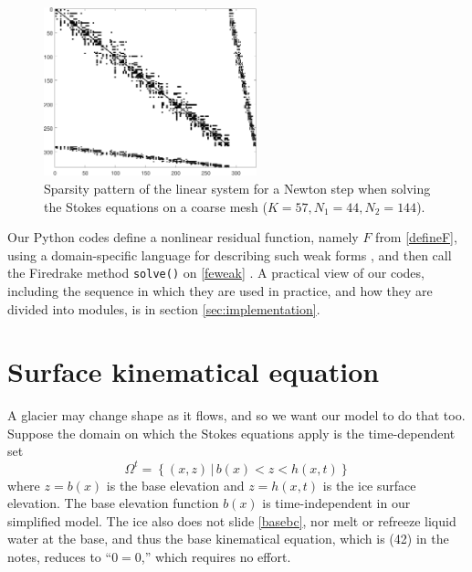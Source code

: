 \documentclass[letterpaper,final,12pt,reqno]{amsart}
\begin{document}
\begin{figure}[h]
\includegraphics[width=0.55\textwidth]{lowspy}
\caption{Sparsity pattern of the linear system for a Newton step when solving the Stokes equations on a coarse mesh ($K=57,N_1=44,N_2=144$).}
\label{fig:lowspy}
\end{figure}

Our Python codes define a nonlinear residual function, namely $F$ from \eqref{defineF}, using a domain-specific language for describing such weak forms \cite{Alnaesetal2014}, and then call the Firedrake method \texttt{solve()} on \eqref{feweak} \cite{Rathgeberetal2016}.  A practical view of our codes, including the sequence in which they are used in practice, and how they are divided into modules, is in section \ref{sec:implementation}.




\section{Surface kinematical equation} \label{sec:kinematical}

A glacier may change shape as it flows, and so we want our model to do that too.  Suppose the domain on which the Stokes equations apply is the time-dependent set
\begin{equation}
\Omega^t = \left\{(x,z)\,\big|\, b(x) < z < h(x,t)\right\}  \label{Omegat}
\end{equation}
where $z=b(x)$ is the base elevation and $z=h(x,t)$ is the ice surface elevation.  The base elevation function $b(x)$ is time-independent in our simplified model.  The ice also does not slide \eqref{basebc}, nor melt or refreeze liquid water at the base, and thus the base kinematical equation, which is (42) in the notes, reduces to ``$0=0$,'' which requires no effort.
\end{document}
